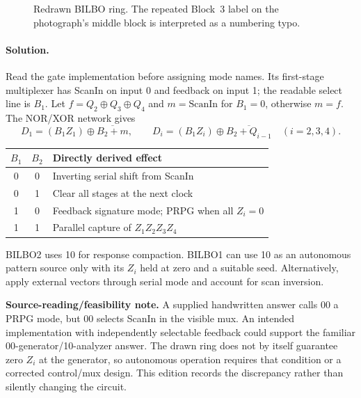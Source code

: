 \documentclass[11pt,a4paper]{article}
\newcommand{\sol}{\paragraph{Solution.}}
\begin{document}
\begin{figure}[ht]\centering
{}
\caption{Redrawn BILBO ring. The repeated Block~3 label on the photograph's middle block is interpreted as a numbering typo.}
\end{figure}
\sol Read the gate implementation before assigning mode names. Its first-stage multiplexer has ScanIn on input 0 and feedback on input 1; the readable select line is $B_1$. Let $f=Q_2\oplus Q_3\oplus Q_4$ and $m=\mathrm{ScanIn}$ for $B_1=0$, otherwise $m=f$. The NOR/XOR network gives
\[
 D_1=(B_1Z_1)\oplus\overline{B_2+m},\qquad
 D_i=(B_1Z_i)\oplus\overline{B_2+Q_{i-1}}\quad(i=2,3,4).
\]
\begin{center}\begin{tabular}{ccl}\toprule $B_1$&$B_2$&Directly derived effect\\\midrule
0&0&Inverting serial shift from ScanIn\\
0&1&Clear all stages at the next clock\\
1&0&Feedback signature mode; PRPG when all $Z_i=0$\\
1&1&Parallel capture of $Z_1Z_2Z_3Z_4$\\\bottomrule
\end{tabular}\end{center}
BILBO2 uses 10 for response compaction. BILBO1 can use 10 as an autonomous pattern source only with its $Z_i$ held at zero and a suitable seed. Alternatively, apply external vectors through serial mode and account for scan inversion.

\textbf{Source-reading/feasibility note.} A supplied handwritten answer calls 00 a PRPG mode, but 00 selects ScanIn in the visible mux. An intended implementation with independently selectable feedback could support the familiar 00-generator/10-analyzer answer. The drawn ring does not by itself guarantee zero $Z_i$ at the generator, so autonomous operation requires that condition or a corrected control/mux design. This edition records the discrepancy rather than silently changing the circuit.
\end{document}
